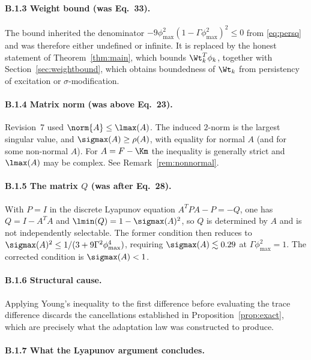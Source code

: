 \paragraph{B.1.3 Weight bound (was Eq.~33).}
The bound inherited the denominator
$-9\phi_{\max}^2(1-\Gamma\phi_{\max}^2)^2\le0$ from \eqref{eq:persq} and was
therefore either undefined or infinite. It is replaced by the honest statement
of Theorem~\ref{thm:main}, which bounds $\Wt_k^T\phi_k$, together with
Section~\ref{sec:weightbound}, which obtains boundedness of $\Wt_k$ from
persistency of excitation or $\sigma$-modification.

\paragraph{B.1.4 Matrix norm (was above Eq.~23).}
Revision~7 used $\norm{A}\le\lmax(A)$. The induced $2$-norm is the largest
singular value, and $\sigmax(A)\ge\rho(A)$, with equality for normal $A$ (and
for some non-normal $A$).
For $A=F-\Km$ the inequality is generally strict and $\lmax(A)$ may be complex.
See Remark~\ref{rem:nonnormal}.

\paragraph{B.1.5 The matrix $Q$ (was after Eq.~28).}
With $P=I$ in the discrete Lyapunov equation $A^TPA-P=-Q$, one has
$Q=I-A^TA$ and $\lmin(Q)=1-\sigmax(A)^2$, so $Q$ is determined by $A$ and is not
independently selectable. The former condition then reduces to
$\sigmax(A)^2\le1/(3+9\Gamma^2\phi_{\max}^4)$, requiring
$\sigmax(A)\lesssim0.29$ at $\Gamma\phi_{\max}^2=1$. The corrected condition is
$\sigmax(A)<1$.

\paragraph{B.1.6 Structural cause.}
Applying Young's inequality to the first difference before evaluating the trace
difference discards the cancellations established in
Proposition~\ref{prop:exact}, which are precisely what the adaptation law was
constructed to produce.

\paragraph{B.1.7 What the Lyapunov argument concludes.} 

